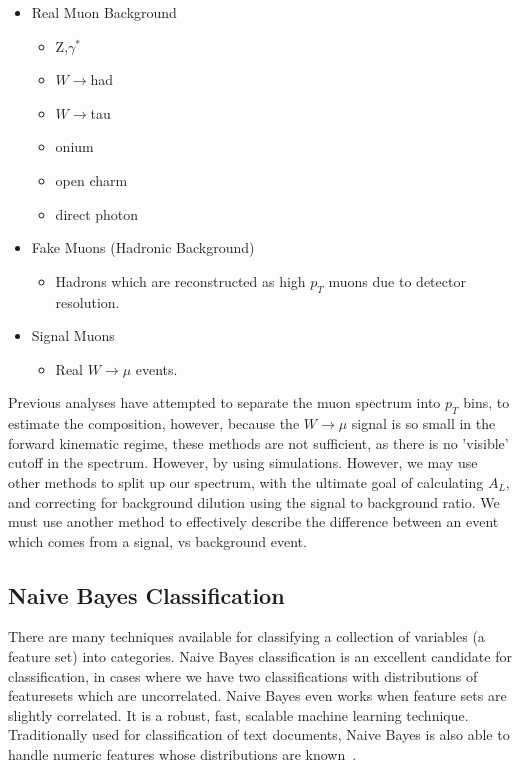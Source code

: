 \begin{itemize}
	\item Real Muon Background
		\begin{itemize}
			\item Z,$\gamma^*$
			\item $W\rightarrow$had
			\item $W\rightarrow$tau
		  \item onium
			\item open charm
			\item direct photon
		\end{itemize}
	\item Fake Muons (Hadronic Background)
		\begin{itemize}	
			\item Hadrons which are reconstructed as high $p_T$ muons due to detector
			resolution.
		\end{itemize}
	\item Signal Muons
		\begin{itemize}	
			\item Real $W\rightarrow\mu$ events.
		\end{itemize}
\end{itemize}

Previous analyses have attempted to separate the muon spectrum into $p_T$ bins,
to estimate the composition, however, because the $W\rightarrow\mu$ signal is so
small in the forward kinematic regime, these methods are not sufficient, as
there is no 'visible' cutoff in the spectrum. However, by using simulations.
However, we may use other methods to split up our spectrum, with the ultimate
goal of calculating $A_L$, and correcting for background dilution using the
signal to background ratio. We must use another method to effectively describe
the difference between an event which comes from a signal, vs background event.

\subsection{Naive Bayes Classification}
There are many techniques available for classifying a collection of variables
(a feature set) into categories. Naive Bayes classification is an excellent
candidate for classification, in cases where we have two classifications with
distributions of featuresets which are uncorrelated. Naive Bayes even works when
feature sets are slightly correlated. It is a robust, fast, scalable machine
learning technique. Traditionally used for classification of text documents,
Naive Bayes is also able to handle numeric features whose distributions are
known~\cite{collinsnaive}.

